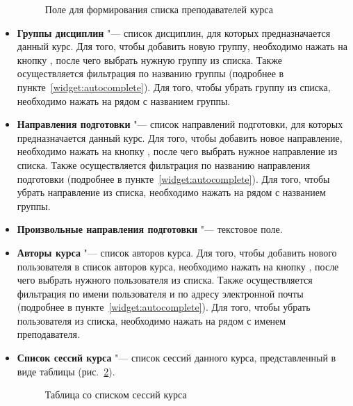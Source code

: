 \begin{itemize}
		\begin{figure}[H]
			\caption{Поле для формирования списка преподавателей курса}
			\label{img:course:instructor_list}
		\end{figure}		

		\item \textbf{Группы дисциплин} "--- список дисциплин, для которых предназначается данный курс. Для того, чтобы добавить новую группу, необходимо нажать на кнопку , после чего выбрать нужную группу из списка. Также осуществляется фильтрация по названию группы (подробнее в пункте~\ref{widget:autocomplete}). Для того, чтобы убрать группу из списка, необходимо нажать на  рядом с названием группы.
		\item \textbf{Направления подготовки} "--- список направлений подготовки, для которых предназначается данный курс. Для того, чтобы добавить новое направление, необходимо нажать на кнопку , после чего выбрать нужное направление из списка. Также осуществляется фильтрация по названию направления подготовки (подробнее в пункте~\ref{widget:autocomplete}). Для того, чтобы убрать направление из списка, необходимо нажать на  рядом с названием группы.
		\item \textbf{Произвольные направления подготовки} "--- текстовое поле.
		\item \textbf{Авторы курса} "--- список авторов курса.  Для того, чтобы добавить нового пользователя в список авторов курса, необходимо нажать на кнопку , после чего выбрать нужного пользователя из списка. Также осуществляется фильтрация по имени пользователя и по адресу электронной почты (подробнее в пункте~\ref{widget:autocomplete}). Для того, чтобы убрать пользователя из списка, необходимо нажать на  рядом с именем преподавателя.
		\item \textbf{Список сессий курса} "--- список сессий данного курса, представленный в виде таблицы  (рис.~\ref{img:course:course_session_table}).
		\begin{figure}[H]
			\caption{Таблица со списком сессий курса}
			\label{img:course:course_session_table}
		\end{figure}
		

\end{itemize}
